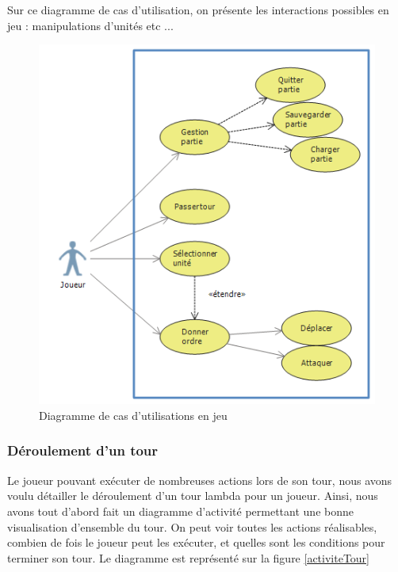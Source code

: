 Sur ce diagramme de cas d'utilisation, on présente les interactions possibles en jeu : manipulations d'unités etc ...
\begin{figure}
	\centering
		\includegraphics[width=\textwidth]{img/ucd_ig.png}
		 \caption{\label{étiquette} Diagramme de cas d'utilisations en jeu}
	\label{casdut2}
\end{figure}

\subsubsection{Déroulement d'un tour}
Le joueur pouvant exécuter de nombreuses actions lors de son tour, nous avons voulu détailler le déroulement d'un tour lambda pour un joueur. Ainsi, nous avons tout d'abord fait un diagramme d'activité permettant une bonne visualisation d'ensemble du tour. On peut voir toutes les actions réalisables, combien de fois le joueur peut les exécuter, et quelles sont les conditions pour terminer son tour. Le diagramme est représenté sur la figure \ref{activiteTour}

